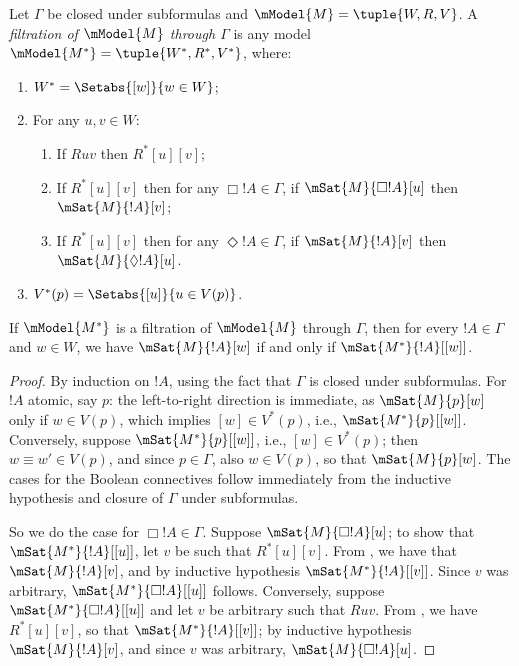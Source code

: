 \documentclass[../../../include/open-logic-section]{subfiles}
\begin{document}


\begin{defn}
  Let $\Gamma$ be closed under subformulas and $\mModel{M} = \tuple{W,
    R, V}$. A \emph{filtration of $\mModel{M}$ through $\Gamma$} is
  any model $\mModel{M^*} = \tuple{W^*,R^*,V^*}$, where:
  \begin{enumerate}
  \item $W^* = \Setabs{[w]}{w \in W}$;
  \item {}%
    For any $u,v \in W$:
    \begin{enumerate}
    \item {}%
      If $Ruv$ then $R^*[u][v]$;
    \item {}%
      If $R^*[u][v]$ then for any $\Box !A \in \Gamma$, if
      $\mSat{M}{\Box!A}[u]$ then $\mSat{M}{!A}[v]$;
    \item {}%
      If $R^*[u][v]$ then for any $\Diamond !A \in \Gamma$, if
      $\mSat{M}{!A}[v]$ then $\mSat{M}{\Diamond!A}[u]$.
    \end{enumerate}
  \item $V^*(p) = \Setabs{[u]}{u \in V(p)}$.
  \end{enumerate}
\end{defn}

\begin{thm}
  If $\mModel{M^*}$ is a filtration of $\mModel{M}$ through $\Gamma$,
  then for every $!A \in \Gamma$ and $w \in W$, we have
  $\mSat{M}{!A}[w]$ if and only if $\mSat{M^*}{!A}[{[w]}]$.
\end{thm}

\begin{proof}
  By induction on $!A$, using the fact that $\Gamma$ is closed under
  subformulas. For $!A$ atomic, say $p$: the left-to-right direction
  is immediate, as $\mSat{M}{p}[w]$ only if $w \in V(p)$, which
  implies $[w] \in V^*(p)$, i.e., $\mSat{M^*}{p}[{[w]}]$. Conversely,
  suppose $\mSat{M^*}{p}[{[w]}]$, i.e., $[w] \in V^*(p)$; then $w
  \equiv w' \in V(p)$, and since $p \in \Gamma$, also $w \in V(p)$, so
  that $\mSat{M}{p}[w]$. The cases for the Boolean connectives follow
  immediately from the inductive hypothesis and closure of $\Gamma$
  under subformulas.

  So we do the case for $\Box!A \in \Gamma$.  Suppose
  $\mSat{M}{\Box!A}[u]$; to show that $\mSat{M^*}{!A}[{[u]}]$, let $v$
  be such that $R^*[u][v]$. From , we have that $\mSat{M}{!A}[v]$, and by inductive
  hypothesis $\mSat{M^*}{!A}[{[v]}]$. Since $v$ was arbitrary,
  $\mSat{M^*}{\Box!A}[{[u]}]$ follows. Conversely, suppose
  $\mSat{M^*}{\Box!A}[{[u]}]$ and let $v$ be arbitrary such that
  $Ruv$. From , we have
  $R^*[u][v]$, so that $\mSat{M^*}{!A}[{[v]}]$; by inductive
  hypothesis $\mSat{M}{!A}[v]$, and since $v$ was arbitrary,
  $\mSat{M}{\Box!A}[u]$.
\end{proof}
\end{document}
